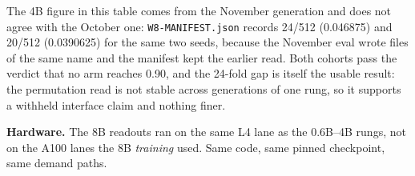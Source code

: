 \documentclass[11pt,a4paper]{article}
\begin{document}
The 4B figure in this table comes from the November generation and does not agree with the October
one: \texttt{W8-MANIFEST.json} records 24/512 (0.046875) and 20/512 (0.0390625) for the same two
seeds, because the November eval wrote files of the same name and the manifest kept the earlier
read. Both cohorts pass the verdict that no arm reaches 0.90, and the 24-fold gap is itself the
usable result: the permutation read is not stable across generations of one rung, so it supports a
withheld interface claim and nothing finer.

\textbf{Hardware.} The 8B readouts ran on the same L4 lane as the 0.6B--4B rungs, not on the A100 lanes
the 8B \emph{training} used. Same code, same pinned checkpoint, same demand paths.
\end{document}
